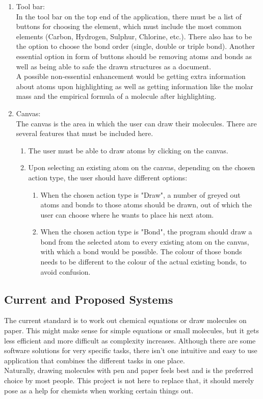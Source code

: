 \documentclass[a4paper,12pt]{article}
\begin{document}
\begin{enumerate}

\item Tool bar:\\
In the tool bar on the top end of the application, there must be a list of buttons for choosing the element, which must include the most common elements (Carbon, Hydrogen, Sulphur, Chlorine, etc.). There also has to be the option to choose the bond order (single, double or triple bond). Another essential option in form of buttons should be removing atoms and bonds as well as being able to safe the drawn structures as a document.\\
A possible non-essential enhancement would be getting extra information about atoms upon highlighting as well as getting information like the molar mass and the empirical formula of a molecule after highlighting.
\item Canvas:\\
The canvas is the area in which the user can draw their molecules. There are several features that must be included here.\\
	\begin{enumerate}
	\item The user must be able to draw atoms by clicking on the canvas.
	\item Upon selecting an existing atom on the canvas, depending on the chosen action type, the user should have different options:
		\begin{enumerate}
		\item When the chosen action type is "Draw", a number of greyed out atoms and bonds to those atoms should be drawn, out of which the user can choose where he wants to place his next atom.
		\item When the chosen action type is "Bond", the program should draw a bond from the selected atom to every existing atom on the canvas, with which a bond would be possible. The colour of those bonds needs to be different to the colour of the actual existing 		bonds, to avoid confusion.
		\end{enumerate}
	\end{enumerate}
\end{enumerate}

\subsection{Current and Proposed Systems}

The current standard is to work out chemical equations or draw molecules on paper. This might make sense for simple equations or small molecules, but it gets less efficient and more difficult as complexity increases. Although there are some software solutions for very specific tasks, there isn't one intuitive and easy to use application that combines the different tasks in one place.\\
\linebreak
Naturally, drawing molecules with pen and paper feels best and is the preferred choice by most people. This project is not here to replace that, it should merely pose as a help for chemists when working certain things out.
\end{document}
